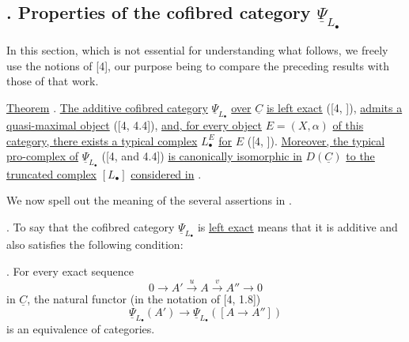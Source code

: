 
\subsection*{. Properties of the cofibred category
$\underline\Psi_{L_\bullet}$}

In this section, which is not essential for understanding what
follows, we freely use the notions of [4], our purpose being to
compare the preceding results with those of that work.

\underline{Theorem} . \underline{The additive cofibred category}
$\underline\Psi_{L_\bullet}$ \underline{over} $\underline C$
\underline{is left exact} ([4, ]), \underline{admits a
quasi-maximal object} ([4, 4.4]), \underline{and, for every object}
$E=(X,\alpha)$ \underline{of this category, there exists a typical
complex} $L^E_\bullet$ \underline{for} $E$ ([4, ]).
\underline{Moreover, the typical pro-complex of}
$\underline\Psi_{L_\bullet}$ ([4,  and 4.4])
\underline{is canonically isomorphic in} $D(\underline C)$
\underline{to the truncated complex} $[L_\bullet]$
\underline{considered in} .

We now spell out the meaning of the several assertions in .

. To say that the cofibred category
$\underline\Psi_{L_\bullet}$ is \underline{left exact} means that it
is additive and also satisfies the following condition:

. For every exact sequence
\[
 0\longrightarrow A'\xrightarrow{u}A\xrightarrow{v}A''
 \longrightarrow0
\]
in $\underline C$, the natural functor (in the notation of [4, 1.8])
\[
 \underline\Psi_{L_\bullet}(A')
 \longrightarrow
 \underline\Psi_{L_\bullet}([A\longrightarrow A''])
\]
is an equivalence of categories.

